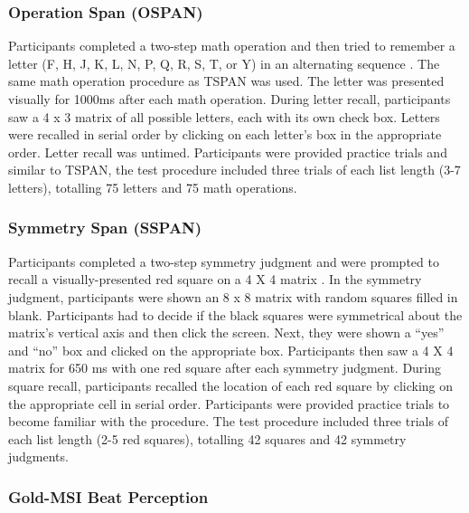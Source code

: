 \documentclass[12pt,]{book}
\begin{document}
\hypertarget{operation-span-ospan}{%
\subsubsection{Operation Span (OSPAN)}\label{operation-span-ospan}}

Participants completed a two-step math operation and then tried to remember a letter (F, H, J, K, L, N, P, Q, R, S, T, or
Y) in an alternating sequence \citep{unsworthAutomatedVersionOperation2005}.
The same math operation procedure as TSPAN was used.
The letter was presented visually for 1000ms after each math
operation.
During letter recall, participants saw a 4 x 3 matrix of all possible letters, each with its own check box.
Letters were recalled in serial order by clicking on each letter's box in the appropriate order.
Letter recall was untimed.
Participants were provided practice trials and similar to TSPAN, the test procedure included three trials of each list length (3-7 letters), totalling 75 letters and 75 math operations.

\hypertarget{symmetry-span-sspan}{%
\subsubsection{Symmetry Span (SSPAN)}\label{symmetry-span-sspan}}

Participants completed a two-step symmetry judgment and were prompted to recall a visually-presented red square on a 4 X 4 matrix \citep{unsworthAutomatedVersionOperation2005}.
In the symmetry judgment, participants were shown an 8 x 8 matrix with random squares filled in blank.
Participants had to decide if the black squares were symmetrical about the matrix's vertical axis and then click the screen.
Next, they were shown a ``yes'' and ``no'' box and clicked on the appropriate box.
Participants then saw a 4 X 4 matrix for 650 ms with one red square after each symmetry judgment.
During square recall, participants recalled the location of each red square by clicking on the appropriate cell in serial order.
Participants were provided practice trials to become familiar with the procedure.
The test procedure included three trials of each list length (2-5 red squares), totalling 42 squares and 42 symmetry judgments.

\hypertarget{gold-msi-beat-perception}{%
\subsubsection{Gold-MSI Beat Perception}\label{gold-msi-beat-perception}}
\end{document}
